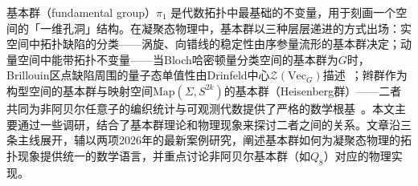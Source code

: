 \documentclass[a4paper,11pt]{ctexart}
\title{\vspace{-1.5cm}{\bfseries 基本群与凝聚态物质的拓扑结构}}
\author{}
\date{}
\begin{document}
\maketitle

\begin{center}
\begin{minipage}{0.85\textwidth}
\small
{}基本群（fundamental group）$\pi_1$ 是代数拓扑中最基础的不变量，用于刻画一个空间的「一维孔洞」结构。在凝聚态物理中，基本群以三种层层递进的方式出场：实空间中拓扑缺陷的分类——涡旋、向错线的稳定性由序参量流形的基本群决定；动量空间中能带拓扑不变量——当Bloch哈密顿量分类空间的基本群为$G$时，Brillouin区点缺陷周围的量子态单值性由Drinfeld中心$\mathcal{Z}(\mathrm{Vec}_G)$描述~\cite{Sati2026Drinfeld}；辫群作为构型空间的基本群与映射空间$\mathrm{Map}(\Sigma,S^{2k})$的基本群（Heisenberg群）——二者共同为非阿贝尔任意子的编织统计与可观测代数提供了严格的数学根基~\cite{Kallel2026Anyons}。本文主要通过一些调研，结合了基本群理论和物理现象来探讨二者之间的关系。文章沿三条主线展开，辅以两项2026年的最新案例研究，阐述基本群如何为凝聚态物理的拓扑现象提供统一的数学语言，并重点讨论非阿贝尔基本群（如$Q_8$）对应的物理实现。
\end{minipage}
\end{center}
\end{document}
